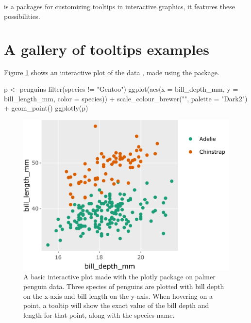  is a packages for customizing tooltips in interactive
graphics, it features these possibilities.

\hypertarget{a-gallery-of-tooltips-examples}{%
\section{A gallery of tooltips
examples}\label{a-gallery-of-tooltips-examples}}

Figure \ref{fig:penguins-plotly} shows an interactive plot of the
 data \citep{palmerpenguins}, made using the
 package.

\begin{Schunk}
\begin{Sinput}
p <- penguins %
  filter(species != "Gentoo") %
  ggplot(aes(x = bill_depth_mm, y = bill_length_mm, 
             color = species)) + 
  scale_colour_brewer("", palette = "Dark2") +
  geom_point()
ggplotly(p)
\end{Sinput}
\begin{figure}
\includegraphics{sample-article_files/figure-latex/penguins-plotly-1} \caption[A basic interactive plot made with the plotly package on palmer penguin data]{A basic interactive plot made with the plotly package on palmer penguin data. Three species of penguins are plotted with bill depth on the x-axis and bill length on the y-axis. When hovering on a point, a tooltip will show the exact value of the bill depth and length for that point, along with the species name.}\label{fig:penguins-plotly}
\end{figure}
\end{Schunk}

